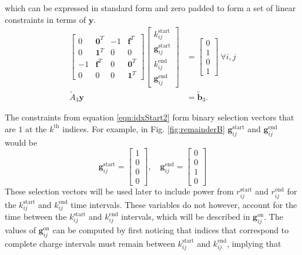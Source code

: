 which can be expressed in standard form and zero padded to form a set of linear constraints in terms of $\mathbf{y}$.
\begin{equation} \label{eqn:idxStart2}\begin{aligned}
	\begin{bmatrix} 0 & \mathbf{0}^T & -1 & \mathbf{f}^T \\
		        0 & \mathbf{1}^T &  0 & 0            \\
		       -1 & \mathbf{f}^T & 0 & \mathbf{0}^T  \\
		        0 & 0            & 0 & \mathbf{1}^T 
	\end{bmatrix} 
	\begin{bmatrix} k_{ij}^{\text{start}}       \\
		        \mathbf{g}_{ij}^{\text{start}} \\ 
			k_{ij}^{\text{end}}        \\ 
			\mathbf{g}_{ij}^{\text{end}} 
	\end{bmatrix} &= 
	\begin{bmatrix} 0 \\ 
			1 \\
	                0 \\
			1
	\end{bmatrix} \ \forall i,j \\
	\tilde{A}_3\mathbf{y} &= \tilde{\mathbf{b}}_3.
\end{aligned} \end{equation}

The constraints from equation \eqref{eqn:idxStart2} form binary selection vectors that are $1$ at the $k^{\text{th}}$ indices.  For example, in Fig. \ref{fig:remainderB} $\mathbf{g}_{ij}^{\text{start}}$ and $\mathbf{g}_{ij}^{\text{end}}$ would be 
\begin{equation}
	\mathbf{g}_{ij}^{\text{start}} = \begin{bmatrix} 1 \\ 0 \\ 0 \\ 0\end{bmatrix}, \quad \mathbf{g}_{ij}^{\text{end}} = \begin{bmatrix} 0 \\ 0 \\ 1 \\ 0\end{bmatrix}
\end{equation}
These selection vectors will be used later to include power from $r_{ij}^{\text{start}}$ and $r_{ij}^{\text{end}}$ for the $k_{ij}^{\text{start}}$ and $k_{ij}^{\text{end}}$ time intervals. These variables do not however, account for the time between the $k_{ij}^{\text{start}}$ and $k_{ij}^{\text{end}}$ intervals, which will be described in $\mathbf{g}_{ij}^{\text{on}}$. The values of $\mathbf{g}_{ij}^{\text{on}}$ can be computed by first noticing that indices that correspond to complete charge intervals must remain between $k_{ij}^{\text{start}}$ and $k_{ij}^{\text{end}}$, implying that 
